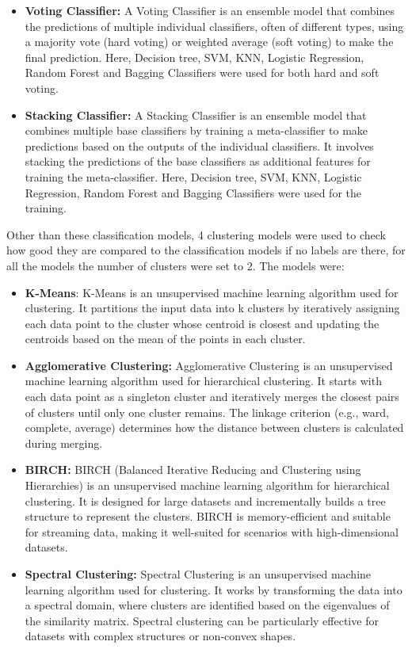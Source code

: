 \documentclass{article}
\begin{document}
\begin{itemize}
    \item  \textbf{Voting Classifier:} A Voting Classifier is an ensemble model that combines the predictions of multiple individual classifiers, often of different types, using a majority vote (hard voting) or weighted average (soft voting) to make the final prediction. Here, Decision tree, SVM, KNN, Logistic Regression, Random Forest and Bagging Classifiers were used for both hard and soft voting.

    \item \textbf{Stacking Classifier:} A Stacking Classifier is an ensemble model that combines multiple base classifiers by training a meta-classifier to make predictions based on the outputs of the individual classifiers. It involves stacking the predictions of the base classifiers as additional features for training the meta-classifier. Here, Decision tree, SVM, KNN, Logistic Regression, Random Forest and Bagging Classifiers were used for the training.
    
\end{itemize}

Other than these classification models, 4 clustering models were used to check how good they are compared to the classification models if no labels are there, for all the models the number of clusters were set to 2. The models were:

\begin{itemize}
    \item \textbf{K-Means}: K-Means is an unsupervised machine learning algorithm used for clustering. It partitions the input data into k clusters by iteratively assigning each data point to the cluster whose centroid is closest and updating the centroids based on the mean of the points in each cluster.

    \item \textbf{Agglomerative Clustering:} Agglomerative Clustering is an unsupervised machine learning algorithm used for hierarchical clustering. It starts with each data point as a singleton cluster and iteratively merges the closest pairs of clusters until only one cluster remains. The linkage criterion (e.g., ward, complete, average) determines how the distance between clusters is calculated during merging.
    
    \item \textbf{BIRCH:} BIRCH (Balanced Iterative Reducing and Clustering using Hierarchies) is an unsupervised machine learning algorithm for hierarchical clustering. It is designed for large datasets and incrementally builds a tree structure to represent the clusters. BIRCH is memory-efficient and suitable for streaming data, making it well-suited for scenarios with high-dimensional datasets.

    \item  \textbf{Spectral Clustering:} Spectral Clustering is an unsupervised machine learning algorithm used for clustering. It works by transforming the data into a spectral domain, where clusters are identified based on the eigenvalues of the similarity matrix. Spectral clustering can be particularly effective for datasets with complex structures or non-convex shapes.

\end{itemize}
\end{document}
